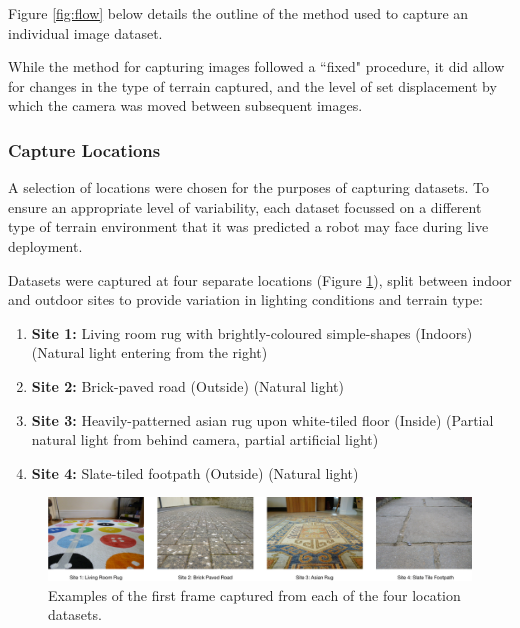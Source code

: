 Figure \ref{fig:flow} below details the outline of the method used to capture an individual image dataset.

While the method for capturing images followed a ``fixed" procedure, it did allow for changes in the type of terrain captured, and the level of set displacement by which the camera was moved between subsequent images.

\subsubsection{Capture Locations}

A selection of locations were chosen for the purposes of capturing datasets. To ensure an appropriate level of variability, each dataset focussed on a different type of terrain environment that it was predicted a robot may face during live deployment.

Datasets were captured at four separate locations (Figure \ref{fig:location}), split between indoor and outdoor sites to provide variation in lighting conditions and terrain type:

\begin{enumerate}
	\item \textbf{Site 1:} Living room rug with brightly-coloured simple-shapes (Indoors) (Natural light entering from the right)
	\item \textbf{Site 2:} Brick-paved road (Outside) (Natural light)
	\item \textbf{Site 3:} Heavily-patterned asian rug upon white-tiled floor (Inside) (Partial natural light from behind camera, partial artificial light)
	\item \textbf{Site 4:} Slate-tiled footpath (Outside) (Natural light)
\end{enumerate}

\begin{figure}[ht!]
\centering
\includegraphics[scale=0.4]{images/locations.png}
  \caption{Examples of the first frame captured from each of the four location datasets.}
\label{fig:location}
\end{figure}

